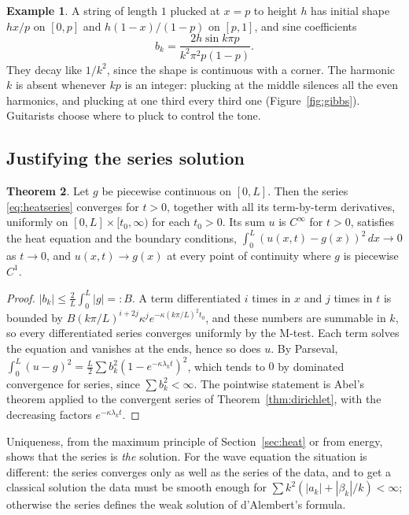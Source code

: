 \documentclass[11pt,a4paper]{article}
\numberwithin{equation}{section}
\theoremstyle{definition}
\newtheorem{thm}{Theorem}[subsection]
\newtheorem{exa}[thm]{Example}
\begin{document}
\begin{exa}
\label{ex:pluck}
A string of length $1$ plucked at $x = p$ to height $h$ has initial shape $hx/p$ on $[0, p]$ and $h(1 - x)/(1 - p)$ on $[p, 1]$, and sine coefficients
\[
b_k = \frac{2h\sin k\pi p}{k^2\pi^2p(1 - p)} .
\]
They decay like $1/k^2$, since the shape is continuous with a corner. The harmonic $k$ is absent whenever $kp$ is an integer: plucking at the middle silences all the even harmonics, and plucking at one third every third one (Figure~\ref{fig:gibbs}). Guitarists choose where to pluck to control the tone.
\end{exa}

\subsection{Justifying the series solution}
\label{ssec:justify}

\begin{thm}
\label{thm:heatseries}
Let $g$ be piecewise continuous on $[0, L]$. Then the series \eqref{eq:heatseries} converges for $t > 0$, together with all its term-by-term derivatives, uniformly on $[0, L] \times [t_0, \infty)$ for each $t_0 > 0$. Its sum $u$ is $C^\infty$ for $t > 0$, satisfies the heat equation and the boundary conditions,
$\int_0^L(u(x, t) - g(x))^2\,dx \to 0$ as $t \to 0$, and $u(x, t) \to g(x)$ at every point of continuity where $g$ is piecewise $C^1$.
\end{thm}

\begin{proof}
$|b_k| \leq \frac2L\int_0^L|g| =: B$. A term differentiated $i$ times in $x$ and $j$ times in $t$ is bounded by $B(k\pi/L)^{i + 2j}\kappa^je^{-\kappa(k\pi/L)^2t_0}$, and these numbers are summable in $k$, so every differentiated series converges uniformly by the M-test. Each term solves the equation and vanishes at the ends,
hence so does $u$. By Parseval, $\int_0^L(u - g)^2 = \frac L2\sum b_k^2(1 - e^{-\kappa\lambda_kt})^2$, which tends to $0$ by dominated convergence for series, since $\sum b_k^2 < \infty$. The pointwise statement is Abel's theorem applied to the convergent series of Theorem~\ref{thm:dirichlet}, with the decreasing factors
$e^{-\kappa\lambda_kt}$.
\end{proof}

Uniqueness, from the maximum principle of Section~\ref{sec:heat} or from energy, shows that the series is \emph{the} solution. For the wave equation the situation is different: the series converges only as well as the series of the data, and to get a classical solution the data must be smooth enough for
$\sum k^2(|a_k| + |\beta_k|/k) < \infty$; otherwise the series defines the weak solution of d'Alembert's formula.
\end{document}
